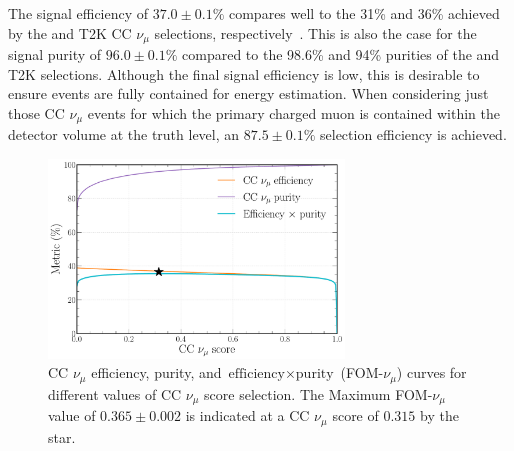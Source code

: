 The signal efficiency of $37.0\pm0.1\%$ compares well to the 31\% and 36\% achieved by the \nova
and T2K CC $\nu_{\mu}$ selections, respectively~\cite{acero2019, abe2015}. This is also the case
for the signal purity of $96.0\pm0.1\%$ compared to the 98.6\% and 94\% purities of the \nova and
T2K selections. Although the final signal efficiency is low, this is desirable to ensure events
are fully contained for energy estimation. When considering just those CC $\nu_{\mu}$ events for
which the primary charged muon is contained within the detector volume at the truth level, an
$87.5\pm0.1\%$ selection efficiency is achieved.

\begin{figure} %
    \includegraphics[width=0.7\textwidth]{diagrams/7-results/final_numu_eff_curves.pdf}
    \caption[CC $\nu_{\mu}$ efficiency, purity, and $\text{efficiency}\times\text{purity}$ curves]
    {CC $\nu_{\mu}$ efficiency, purity, and $\text{efficiency}\times\text{purity}$
        (FOM-$\nu_{\mu}$) curves for different values of CC $\nu_{\mu}$ score selection. The
        Maximum FOM-$\nu_{\mu}$ value of $0.365\pm0.002$ is indicated at a CC $\nu_{\mu}$ score of
        $0.315$ by the star.}
    \label{fig:final_numu_eff_curves}
\end{figure}

